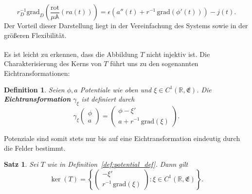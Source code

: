 \documentclass[11pt,a4paper,leqno]{report}
\newtheorem{proposition}{Satz}[chapter]
\newtheorem{definition}[theorem]{Definition}
\numberwithin{equation}{chapter}
\begin{document}
\begin{equation} \label{eq:potential_ampere}
	r_D^{-1} \mathrm{grad}_D \left(\frac{\mathrm{rot}}{\mu\mathbb{A}}\left( r a(t) \right)  \right)
	= \epsilon \left( a''(t) + r^{-1}\, \mathrm{grad}(\phi'(t)) \right) - j(t).
\end{equation}
Der Vorteil dieser Darstellung liegt in der Vereinfachung des Systems sowie in der größeren Flexibilität. \\ 
\\
Es ist leicht zu erkennen, dass die Abbildung \(T\) nicht injektiv ist. Die Charakterisierung des Kerns von \(T\) führt uns zu den sogenannten Eichtransformationen: 
\begin{definition}\label{def:eich}
	Seien \(\phi, a\) Potentiale wie oben und \(\xi \in C^1(\mathbb{R}, \mathfrak{E})\).  
	Die \textbf{Eichtransformation} \(\gamma_\xi\) ist definiert durch
	\begin{equation}
		\gamma_\xi \begin{pmatrix} \phi \\ a \end{pmatrix}
		= \begin{pmatrix} \phi - \xi' \\ a + r^{-1}\, \mathrm{grad}(\xi) \end{pmatrix}.
	\end{equation}
\end{definition}
\noindent
Potenziale sind somit stets nur bis auf eine Eichtransformation eindeutig durch die Felder bestimmt.  
\begin{proposition}
	Sei \(T\) wie in Definition~\ref{def:potential_def}. Dann gilt
	\[
	\ker(T) = \left\{ \begin{pmatrix} -\xi' \\ r^{-1}\, \mathrm{grad}(\xi) \end{pmatrix} : \xi \in C^1(\mathbb{R}, \mathfrak{E}) \right\}.
	\]
\end{proposition}
\noindent
\end{document}
